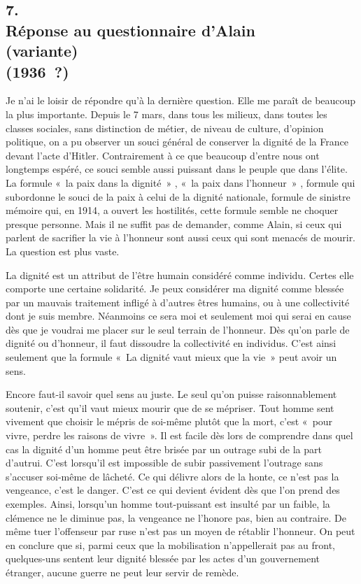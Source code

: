 \documentclass[french,twoside]{book} %
\begin{document}
\subsection[7. Réponse au questionnaire d'Alain, (variante) (1936 ?)]{7. \\
Réponse au questionnaire d'Alain \\
(variante) \\
(1936 ?)}
\noindent \par
Je n'ai le loisir de répondre qu'à la dernière question. Elle me paraît de beaucoup la plus importante. Depuis le 7 mars, dans tous les milieux, dans toutes les classes sociales, sans distinction de métier, de niveau de culture, d'opinion politique, on a pu observer un souci général de conserver la dignité de la France devant l'acte d'Hitler. Contrairement à ce que beaucoup d'entre nous ont longtemps espéré, ce souci semble aussi puissant dans le peuple que dans l'élite. La formule « la paix dans la dignité » , « la paix dans l'honneur » , formule qui subordonne le souci de la paix à celui de la dignité nationale, formule de sinistre mémoire qui, en 1914, a ouvert les hostilités, cette formule semble ne choquer presque personne. Mais il ne suffit pas de demander, comme Alain, si ceux qui parlent de sacrifier la vie à l'honneur sont aussi ceux qui sont menacés de mourir. La question est plus vaste.\par
La dignité est un attribut de l'être humain considéré comme individu. Certes elle comporte une certaine solidarité. Je peux considérer ma dignité comme blessée par un mauvais traitement infligé à d'autres êtres humains, ou à une collectivité dont je suis membre. Néanmoins ce sera moi et seulement moi qui serai en cause dès que je voudrai me placer sur le seul terrain de l'honneur. Dès qu'on parle de dignité ou d'honneur, il faut dissoudre la collectivité en individus. C'est ainsi seulement que la formule « La dignité vaut mieux que la vie » peut avoir un sens.\par
Encore faut-il savoir quel sens au juste. Le seul qu'on puisse raisonna­blement soutenir, c'est qu'il vaut mieux mourir que de se mépriser. Tout homme sent vivement que choisir le mépris de soi-même plutôt que la mort, c'est « pour vivre, perdre les raisons de vivre ». Il est facile dès lors de comprendre dans quel cas la dignité d'un homme peut être brisée par un outrage subi de la part d'autrui. C'est lorsqu'il est impossible de subir passivement l'outrage sans s'accuser soi-même de lâcheté. Ce qui délivre alors de la honte, ce n'est pas la vengeance, c'est le danger. C'est ce qui devient évident dès que l'on prend des exemples. Ainsi, lorsqu'un homme tout-puissant est insulté par un faible, la clémence ne le diminue pas, la vengeance ne l'honore pas, bien au contraire. De même tuer l'offenseur par ruse n'est pas un moyen de rétablir l'honneur. On peut en conclure que si, parmi ceux que la mobilisation n'appellerait pas au front, quelques-uns sentent leur dignité blessée par les actes d'un gouvernement étranger, aucune guerre ne peut leur servir de remède.\par
\end{document}
